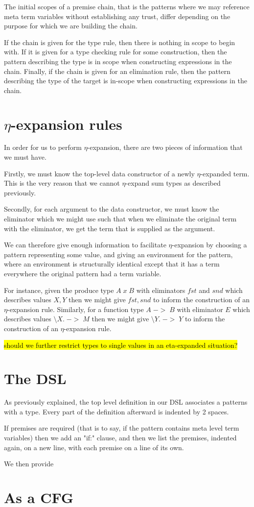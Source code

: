 The initial scopes of a premise chain, that is the patterns where we
may reference meta term variables without establishing any trust,
differ depending on the purpose for which we are building the chain.

If the chain is given for the type rule, then there is nothing in
scope to begin with. If it is given for a type checking rule for some
construction, then the pattern describing the type is in scope when
constructing expressions in the chain. Finally, if the chain is given
for an elimination rule, then the pattern describing the type of the
target is in-scope when constructing expressions in the chain.

\section{$\eta$-expansion rules}

In order for us to perform $\eta$-expansion, there are two pieces of
information that we must have.

Firstly, we must know the top-level data constructor of a newly
$\eta$-expanded term. This is the very reason that we cannot
$\eta$-expand sum types as described previously. 

Secondly, for each argument to the data constructor, we must know the
eliminator which we might use such that when we eliminate the original
term with the eliminator, we get the term that is supplied as the
argument.

We can therefore give enough information to facilitate
$\eta$-expansion by choosing a pattern representing some value, and
giving an environment for the pattern, where an environment is
structurally identical except that it has a term everywhere the
original pattern had a term variable.

For instance, given the produce type $A \; x \; B$ with eliminators
$fst$ and $snd$ which describes values $X , Y$ then we might give $fst
, snd$ to inform the construction of an $\eta$-expansion rule. Similarly,
for a function type $A \; -> \; B$ with eliminator $E$ which describes
values $\setminus X. \; -> \; M$ then we might give $\setminus Y. \;
-> \; Y$ to inform the construction of an $\eta$-expansion rule.

\hl{should we further restrict types to single values in an
  eta-expanded situation?}

\section{The DSL}

As previously explained, the top level definition in our DSL
associates a patterns with a type. Every part of the definition
afterward is indented by 2 spaces.

If premises are required (that is to say, if the pattern contains meta
level term variables) then we add an "if:" clause, and then we list
the premises, indented again, on a new line, with each premise on a
line of its own.

We then provide

\section{As a CFG}
